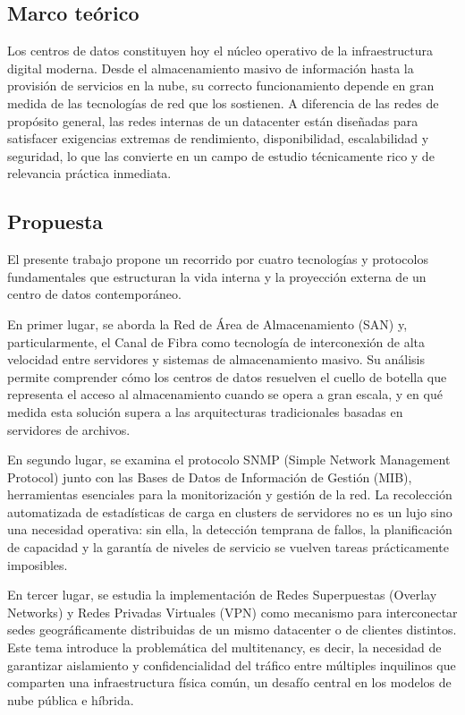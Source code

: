 	\subsection{Marco teórico}
	
	Los centros de datos constituyen hoy el núcleo operativo de la infraestructura digital moderna. Desde el almacenamiento masivo de información hasta la provisión de servicios en la nube, su correcto funcionamiento depende en gran medida de las tecnologías de red que los sostienen. A diferencia de las redes de propósito general, las redes internas de un datacenter están diseñadas para satisfacer exigencias extremas de rendimiento, disponibilidad, escalabilidad y seguridad, lo que las convierte en un campo de estudio técnicamente rico y de relevancia práctica inmediata.
	
	\subsection{Propuesta}
	
	El presente trabajo propone un recorrido por cuatro tecnologías y protocolos fundamentales que estructuran la vida interna y la proyección externa de un centro de datos contemporáneo. 
	
	En primer lugar, se aborda la Red de Área de Almacenamiento (SAN) y, particularmente, el Canal de Fibra como tecnología de interconexión de alta velocidad entre servidores y sistemas de almacenamiento masivo. Su análisis permite comprender cómo los centros de datos resuelven el cuello de botella que representa el acceso al almacenamiento cuando se opera a gran escala, y en qué medida esta solución supera a las arquitecturas tradicionales basadas en servidores de archivos.
	
	En segundo lugar, se examina el protocolo SNMP (Simple Network Management Protocol) junto con las Bases de Datos de Información de Gestión (MIB), herramientas esenciales para la monitorización y gestión de la red. La recolección automatizada de estadísticas de carga en clusters de servidores no es un lujo sino una necesidad operativa: sin ella, la detección temprana de fallos, la planificación de capacidad y la garantía de niveles de servicio se vuelven tareas prácticamente imposibles.
	
	En tercer lugar, se estudia la implementación de Redes Superpuestas (Overlay Networks) y Redes Privadas Virtuales (VPN) como mecanismo para interconectar sedes geográficamente distribuidas de un mismo datacenter o de clientes distintos. Este tema introduce la problemática del multitenancy, es decir, la necesidad de garantizar aislamiento y confidencialidad del tráfico entre múltiples inquilinos que comparten una infraestructura física común, un desafío central en los modelos de nube pública e híbrida.
	
